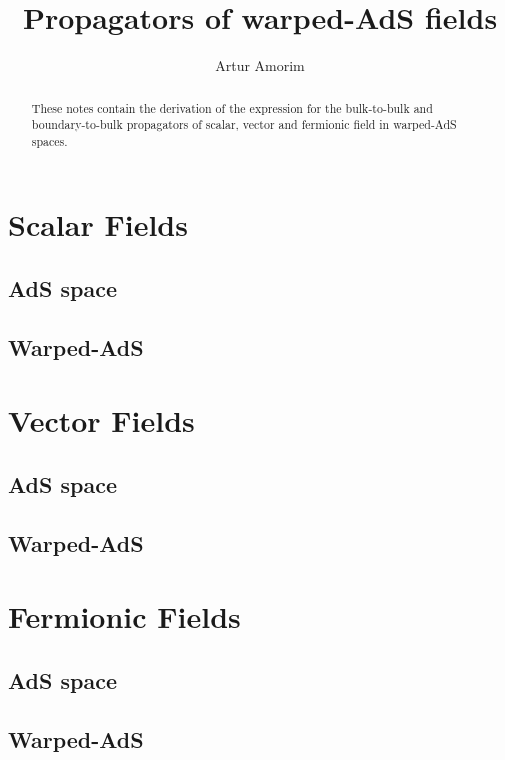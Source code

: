 \documentclass[12pt,a4paper]{article}
\begin{document}
\title{Propagators of warped-AdS fields}
\author{Artur Amorim}

\begin{abstract}
    These notes contain the derivation of the expression for the bulk-to-bulk and boundary-to-bulk propagators of scalar, vector and fermionic field in warped-AdS spaces.
\end{abstract}
\maketitle

\section{Scalar Fields}
\subsection{AdS space}
\subsection{Warped-AdS}
\section{Vector Fields}
\subsection{AdS space}
\subsection{Warped-AdS}
\section{Fermionic Fields}
\subsection{AdS space}
\subsection{Warped-AdS}
\end{document}
